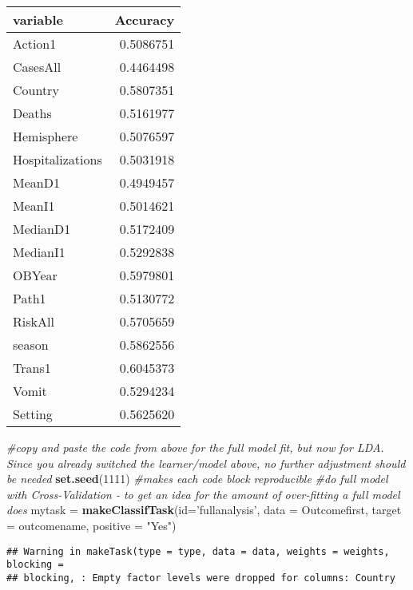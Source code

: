 \documentclass[]{article}
\newenvironment{Shaded}{\begin{snugshade}}{\end{snugshade}}
\newcommand{\CommentTok}[1]{\textcolor[rgb]{0.56,0.35,0.01}{\textit{#1}}}
\newcommand{\DataTypeTok}[1]{\textcolor[rgb]{0.13,0.29,0.53}{#1}}
\newcommand{\DecValTok}[1]{\textcolor[rgb]{0.00,0.00,0.81}{#1}}
\newcommand{\KeywordTok}[1]{\textcolor[rgb]{0.13,0.29,0.53}{\textbf{#1}}}
\newcommand{\NormalTok}[1]{#1}
\newcommand{\OperatorTok}[1]{\textcolor[rgb]{0.81,0.36,0.00}{\textbf{#1}}}
\newcommand{\OtherTok}[1]{\textcolor[rgb]{0.56,0.35,0.01}{#1}}
\newcommand{\StringTok}[1]{\textcolor[rgb]{0.31,0.60,0.02}{#1}}
\begin{document}
\begin{longtable}[]{@{}lr@{}}
\toprule
variable & Accuracy\tabularnewline
\midrule
\endhead
Action1 & 0.5086751\tabularnewline
CasesAll & 0.4464498\tabularnewline
Country & 0.5807351\tabularnewline
Deaths & 0.5161977\tabularnewline
Hemisphere & 0.5076597\tabularnewline
Hospitalizations & 0.5031918\tabularnewline
MeanD1 & 0.4949457\tabularnewline
MeanI1 & 0.5014621\tabularnewline
MedianD1 & 0.5172409\tabularnewline
MedianI1 & 0.5292838\tabularnewline
OBYear & 0.5979801\tabularnewline
Path1 & 0.5130772\tabularnewline
RiskAll & 0.5705659\tabularnewline
season & 0.5862556\tabularnewline
Trans1 & 0.6045373\tabularnewline
Vomit & 0.5294234\tabularnewline
Setting & 0.5625620\tabularnewline
\bottomrule
\end{longtable}

\begin{Shaded}
\begin{Highlighting}[]
\CommentTok{#copy and paste the code from above for the full model fit, but now for LDA. Since you already switched the learner/model above, no further adjustment should be needed}
\KeywordTok{set.seed}\NormalTok{(}\DecValTok{1111}\NormalTok{) }\CommentTok{#makes each code block reproducible}
\CommentTok{#do full model with Cross-Validation - to get an idea for the amount of over-fitting a full model does}
\NormalTok{mytask =}\StringTok{ }\KeywordTok{makeClassifTask}\NormalTok{(}\DataTypeTok{id=}\StringTok{'fullanalysis'}\NormalTok{, }\DataTypeTok{data =}\NormalTok{ Outcomefirst, }\DataTypeTok{target =}\NormalTok{ outcomename, }\DataTypeTok{positive =} \StringTok{"Yes"}\NormalTok{)}
\end{Highlighting}
\end{Shaded}

\begin{verbatim}
## Warning in makeTask(type = type, data = data, weights = weights, blocking =
## blocking, : Empty factor levels were dropped for columns: Country
\end{verbatim}

\begin{Shaded}
\end{Shaded}
\end{document}
